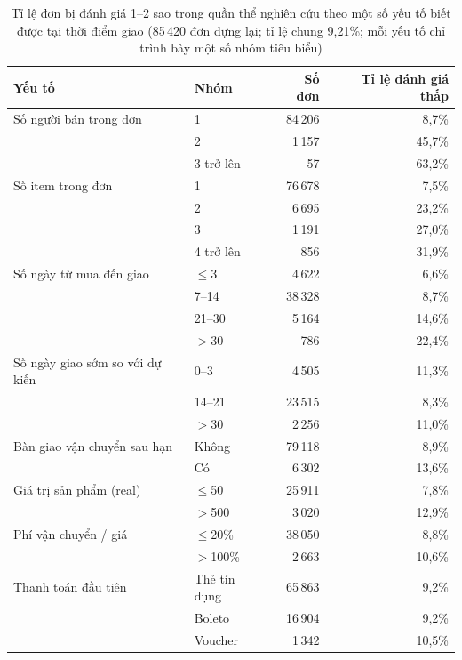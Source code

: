 \documentclass[12pt,a4paper]{report}
\begin{document}
\begin{table}[htbp]\centering\small
\caption{Tỉ lệ đơn bị đánh giá 1--2 sao trong quần thể nghiên cứu theo một số yếu tố biết được tại thời điểm giao (85\,420 đơn dựng lại; tỉ lệ chung 9,21\%; mỗi yếu tố chỉ trình bày một số nhóm tiêu biểu)}\label{tab:eda-segments}
\begin{tabular}{llrr}
\toprule
Yếu tố & Nhóm & Số đơn & Tỉ lệ đánh giá thấp \\
\midrule
Số người bán trong đơn & 1 & 84\,206 & 8,7\% \\
 & 2 & 1\,157 & 45,7\% \\
 & 3 trở lên & 57 & 63,2\% \\
\addlinespace
Số item trong đơn & 1 & 76\,678 & 7,5\% \\
 & 2 & 6\,695 & 23,2\% \\
 & 3 & 1\,191 & 27,0\% \\
 & 4 trở lên & 856 & 31,9\% \\
\addlinespace
Số ngày từ mua đến giao & $\le$3 & 4\,622 & 6,6\% \\
 & 7--14 & 38\,328 & 8,7\% \\
 & 21--30 & 5\,164 & 14,6\% \\
 & $>$30 & 786 & 22,4\% \\
\addlinespace
Số ngày giao sớm so với dự kiến & 0--3 & 4\,505 & 11,3\% \\
 & 14--21 & 23\,515 & 8,3\% \\
 & $>$30 & 2\,256 & 11,0\% \\
\addlinespace
Bàn giao vận chuyển sau hạn & Không & 79\,118 & 8,9\% \\
 & Có & 6\,302 & 13,6\% \\
\addlinespace
Giá trị sản phẩm (real) & $\le$50 & 25\,911 & 7,8\% \\
 & $>$500 & 3\,020 & 12,9\% \\
\addlinespace
Phí vận chuyển / giá & $\le$20\% & 38\,050 & 8,8\% \\
 & $>$100\% & 2\,663 & 10,6\% \\
\addlinespace
Thanh toán đầu tiên & Thẻ tín dụng & 65\,863 & 9,2\% \\
 & Boleto & 16\,904 & 9,2\% \\
 & Voucher & 1\,342 & 10,5\% \\
\bottomrule
\end{tabular}
\end{table}
\end{document}
